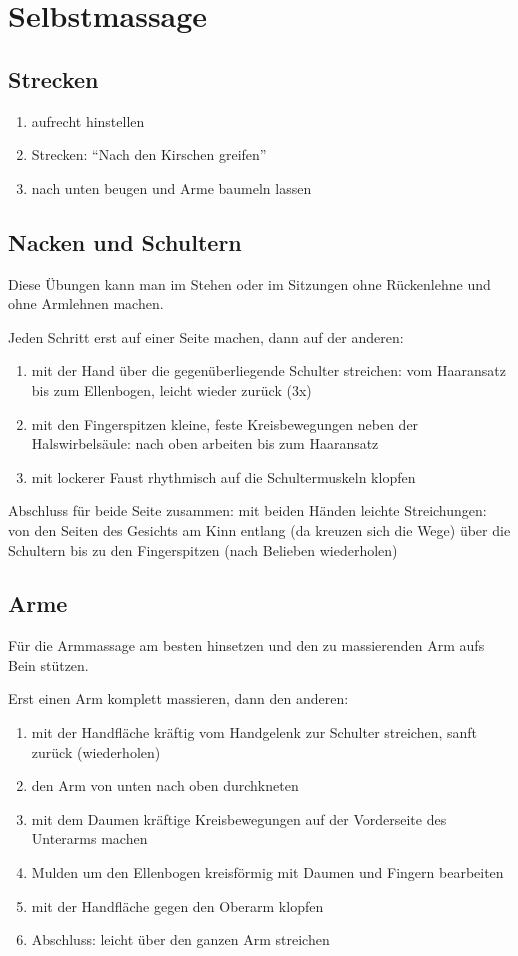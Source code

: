 \chapter{Selbstmassage}

\section{Strecken}
\begin{enumerate}
	\item aufrecht hinstellen
	\item Strecken: "`Nach den Kirschen greifen"'
	\item nach unten beugen und Arme baumeln lassen
\end{enumerate}

\section{Nacken und Schultern}
Diese Übungen kann man im Stehen oder im Sitzungen ohne Rückenlehne und ohne Armlehnen machen.

Jeden Schritt erst auf einer Seite machen, dann auf der anderen:
\begin{enumerate}
	\item mit der Hand über die gegenüberliegende Schulter streichen: vom Haaransatz bis zum Ellenbogen, leicht wieder zurück (3x)
	\item mit den Fingerspitzen kleine, feste Kreisbewegungen neben der Halswirbelsäule: nach oben arbeiten bis zum Haaransatz
	\item mit lockerer Faust rhythmisch auf die Schultermuskeln klopfen
\end{enumerate}

Abschluss für beide Seite zusammen: mit beiden Händen leichte Streichungen: von den Seiten des Gesichts am Kinn entlang (da kreuzen sich die Wege) über die Schultern bis zu den Fingerspitzen (nach Belieben wiederholen)

\section{Arme}
Für die Armmassage am besten hinsetzen und den zu massierenden Arm aufs Bein stützen.

Erst einen Arm komplett massieren, dann den anderen:
\begin{enumerate}
	\item mit der Handfläche kräftig vom Handgelenk zur Schulter streichen, sanft zurück (wiederholen)
	\item den Arm von unten nach oben durchkneten
	\item mit dem Daumen kräftige Kreisbewegungen auf der Vorderseite des Unterarms machen
	\item Mulden um den Ellenbogen kreisförmig mit Daumen und Fingern bearbeiten
	\item mit der Handfläche gegen den Oberarm klopfen
	\item Abschluss: leicht über den ganzen Arm streichen
\end{enumerate}

